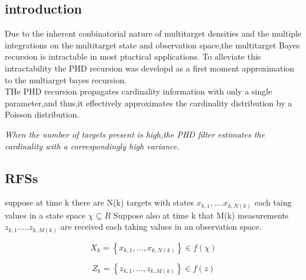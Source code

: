 \documentclass[
paper=128mm:96mm, %
fontsize=11pt, %
pagesize, %
parskip=half-, %
]{scrartcl} %
\newcommand*{\mygreen}[1]{\textcolor{mygreen}{#1}}
\newcommand*{\myblue}[1]{\textcolor{myblue}{#1}}
\newcommand*{\mybrown}[1]{\textcolor{mybrown}{#1}}
\newcommand*{\myred}[1]{\textcolor{myred}{#1}}
\theoremstyle{mythmstyle} %
\begin{document}

\subsection{introduction}

 Due to the inherent conbinatorial nature of multitarget densities and the multiple integrations on the multitarget state and observation space,the multitarget Bayes recursion is intractable in most ptactical applications. To alleviate this intractability the PHD recursion was developd as a first moment approximation to the multiarget bayes recursion.\\
THe PHD recursion propagates cardinality information with only a single parameter,and thus,it effectively approximates the
cardinality distribution by a Poisson distribution.

\textit{When the number of targets present is high,the PHD filter estimates the cardinality with a correspondingly high variance.
}


\clearpage
\subsection{RFSs}
suppose at time k there are N(k) targets with states $x_{k,1},....x_{k,N(k)}$ each taing values in a state space $ \chi\subseteq R$
Suppose also at time k that M(k) measurements $z_{k,1}.....z_{k,M(k)}$ are received each taking values in an observation space.

\begin{equation}
   X_k = \left\{ x_{k,1},...,x_{k,N(k)} \right\}  \in  f(\chi)
\end{equation}

\begin{equation}
   Z_k = \left\{ z_{k,1},...,z_{k,M(k)} \right\}  \in  f(z)
\end{equation}
\end{document}
